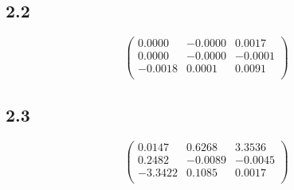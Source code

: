 \documentclass{article}
\begin{document}
\subsection*{2.2}
\begin{equation*}
\begin{pmatrix}
    0.0000 & -0.0000  &  0.0017\\
    0.0000 & -0.0000  & -0.0001\\
   -0.0018 &  0.0001  &  0.0091\\
\end{pmatrix}
\end{equation*}
\subsection*{2.3}
\begin{equation*}
\begin{pmatrix}
    0.0147 &   0.6268 &   3.3536 \\
    0.2482 &  -0.0089 &  -0.0045 \\
   -3.3422 &   0.1085 &   0.0017 \\
\end{pmatrix}
\end{equation*}
\end{document}
